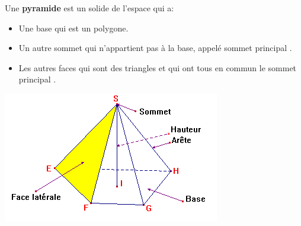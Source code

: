     
\begin{minipage}{0.48\linewidth}
Une \textbf{pyramide} est un solide de l'espace qui a:
\begin{itemize}
\item Une base qui est un polygone.
\item Un autre sommet qui n'appartient pas à la base, appelé \og sommet principal \fg{}.
\item Les autres faces qui sont des triangles et qui ont tous en commun le \og sommet principal \fg{}.  
\end{itemize}
\end{minipage} 
\hfill
\begin{minipage}{0.48\linewidth}
\includegraphics[scale=0.5]{RepS-pyramides_def.png}  
\end{minipage} 